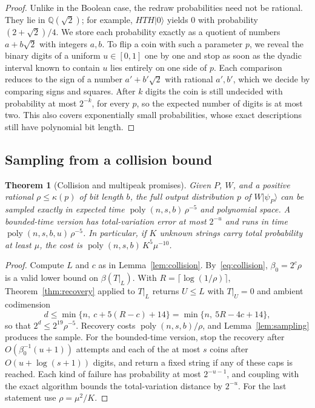 \documentclass[a4paper,onecolumn,11pt,unpublished]{quantumarticle}
\theoremstyle{plain}
\newtheorem{theorem}{Theorem}
\theoremstyle{remark}
\newcommand{\ket}[1]{|#1\rangle}
\DeclareMathOperator{\poly}{poly}
\begin{document}
\begin{proof}
Unlike in the Boolean case, the redraw probabilities need not be rational. They lie in $\mathbb{Q}(\sqrt2)$; for example, $HTH\ket0$ yields $0$ with probability $(2+\sqrt2)/4$. We store each probability exactly as a quotient of numbers $a+b\sqrt2$ with integers $a,b$. To flip a coin with such a parameter $p$, we reveal the binary digits of a uniform $u\in[0,1]$ one by one and stop as soon as the dyadic interval known to contain $u$ lies entirely on one side of $p$. Each comparison reduces to the sign of a number $a'+b'\sqrt2$ with rational $a',b'$, which we decide by comparing signs and squares. After $k$ digits the coin is still undecided with probability at most $2^{-k}$, for every $p$, so the expected number of digits is at most two. This also covers exponentially small probabilities, whose exact descriptions still have polynomial bit length.
\end{proof}

\subsection{Sampling from a collision bound}

\begin{theorem}[Collision and multipeak promises]\label{thm:collision}
Given $P$, $W$, and a positive rational $\rho\le\kappa(p)$ of bit length $b$, the full output distribution $p$ of $W\ket{\psi_P}$ can be sampled exactly in expected time $\poly(n,s,b)\,\rho^{-5}$ and polynomial space. A bounded-time version has total-variation error at most $2^{-u}$ and runs in time $\poly(n,s,b,u)\,\rho^{-5}$. In particular, if $K$ unknown strings carry total probability at least $\mu$, the cost is $\poly(n,s,b)\,K^5\mu^{-10}$.
\end{theorem}

\begin{proof}
Compute $L$ and $c$ as in Lemma~\ref{lem:collision}. By~\eqref{eq:collision}, $\beta_0=2^c\rho$ is a valid lower bound on $\beta(T|_L)$. With $R=\lceil\log(1/\rho)\rceil$, Theorem~\ref{thm:recovery} applied to $T|_L$ returns $U\le L$ with $T|_U=0$ and ambient codimension
\[
d\le\min\{n,\ c+5(R-c)+14\}=\min\{n,\ 5R-4c+14\},
\]
so that $2^d\le2^{19}\rho^{-5}$. Recovery costs $\poly(n,s,b)/\rho$, and Lemma~\ref{lem:sampling} produces the sample. For the bounded-time version, stop the recovery after $O(\beta_0^{-1}(u+1))$ attempts and each of the at most $s$ coins after $O(u+\log(s+1))$ digits, and return a fixed string if any of these caps is reached. Each kind of failure has probability at most $2^{-u-1}$, and coupling with the exact algorithm bounds the total-variation distance by $2^{-u}$. For the last statement use $\rho=\mu^2/K$.
\end{proof}
\end{document}
